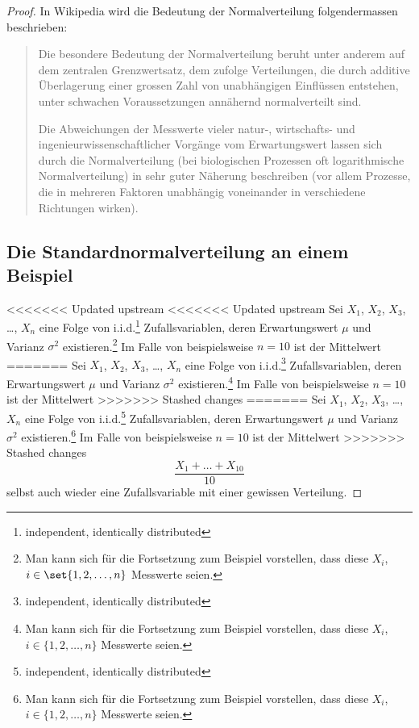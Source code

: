 \documentclass[%
<<<<<<< Updated upstream
<<<<<<< Updated upstream
11pt,%
twoside,%
titlepage,%
german,%
=======
=======
>>>>>>> Stashed changes
11pt,%
twoside,%
titlepage,%
swissgerman,%
<<<<<<< Updated upstream
>>>>>>> Stashed changes
=======
>>>>>>> Stashed changes
headsepline%
]{scrartcl}
\theoremstyle{definition}
\theoremstyle{plain}
\begin{document}
\begin{proof}
In Wikipedia wird die Bedeutung der Normalverteilung folgendermassen beschrieben:
\begin{quote}
 Die besondere Bedeutung der Normalverteilung beruht unter anderem auf dem zentralen Grenzwertsatz, dem zufolge Verteilungen, die durch additive Überlagerung einer grossen Zahl von unabhängigen Einflüssen entstehen, unter schwachen Voraussetzungen annähernd normalverteilt sind.
 
 Die Abweichungen der Messwerte vieler natur-, wirtschafts- und ingenieurwissenschaftlicher Vorgänge vom Erwartungswert lassen sich durch die Normalverteilung (bei biologischen Prozessen oft logarithmische Normalverteilung) in sehr guter Näherung beschreiben (vor allem Prozesse, die in mehreren Faktoren unabhängig voneinander in verschiedene Richtungen wirken).
\end{quote}

\subsection{Die Standardnormalverteilung an einem Beispiel}

<<<<<<< Updated upstream
<<<<<<< Updated upstream
Sei $X_1$, $X_2$, $X_3$, \dots , $X_n$ eine Folge von i.i.d.\footnote{independent, identically distributed} Zufallsvariablen, deren Erwartungswert $\mu$ und Varianz $\sigma^2$ existieren.\footnote{Man kann sich für die Fortsetzung zum Beispiel vorstellen, dass diese $X_i$, $i\in\set{1,2,\dots,n}$ Messwerte seien.} Im Falle von beispielsweise $n=10$ ist der Mittelwert
=======
Sei $X_1$, $X_2$, $X_3$, \dots , $X_n$ eine Folge von i.i.d.\footnote{independent, identically distributed} Zufallsvariablen, deren Erwartungswert $\mu$ und Varianz $\sigma^2$ existieren.\footnote{Man kann sich für die Fortsetzung zum Beispiel vorstellen, dass diese $X_i$, $i\in\{1,2,\dots,n\}$ Messwerte seien.} Im Falle von beispielsweise $n=10$ ist der Mittelwert
>>>>>>> Stashed changes
=======
Sei $X_1$, $X_2$, $X_3$, \dots , $X_n$ eine Folge von i.i.d.\footnote{independent, identically distributed} Zufallsvariablen, deren Erwartungswert $\mu$ und Varianz $\sigma^2$ existieren.\footnote{Man kann sich für die Fortsetzung zum Beispiel vorstellen, dass diese $X_i$, $i\in\{1,2,\dots,n\}$ Messwerte seien.} Im Falle von beispielsweise $n=10$ ist der Mittelwert
>>>>>>> Stashed changes
$$\frac{X_1+\dots+X_{10}}{10}$$
selbst auch wieder eine Zufallsvariable mit einer gewissen Verteilung.


\end{proof}
\end{document}
